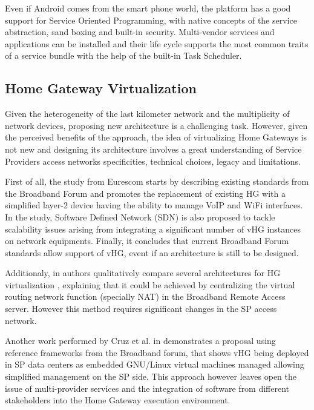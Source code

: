Even if Android comes from the smart phone world, the platform has a good support for Service Oriented Programming, with native concepts of the service abstraction, sand boxing and built-in security. Multi-vendor services and applications can be installed and their life cycle supports the most common traits of a service bundle with the help of the built-in Task Scheduler.

\subsection{Home Gateway Virtualization}
Given the heterogeneity of the last kilometer network and the multiplicity of network devices, proposing new architecture is a challenging task.
However, given the perceived benefits of the approach, the idea of virtualizing Home Gateways is not new and designing  its architecture involves a great understanding of Service Providers access networks specificities, technical choices, legacy and limitations.

First of all, the study from Eurescom \cite{daniel_abgrall_virtual_????} starts by describing existing standards from the Broadband Forum \cite{broadband_forum_functional_2014} and promotes the replacement of existing HG  with a simplified layer-2 device having the ability to manage VoIP and WiFi interfaces.
In the study, Software Defined Network (SDN) \cite{kim_improving_2013} is also proposed to tackle scalability issues arising from integrating a significant number of vHG instances on network equipments.
Finally,  it concludes that current Broadband Forum standards allow support of vHG, event if an architecture is still to be designed.

Additionaly, in \cite{da_silva_home_2011} authors qualitatively compare several architectures for HG virtualization , explaining that it could be achieved by centralizing the virtual routing network function (specially NAT) in the Broadband Remote Access server. However this method requires significant changes in the SP access network.

Another work performed by Cruz et al. in \cite{cruz_architecture_2013} demonstrates a proposal using reference frameworks from the Broadband forum, that shows vHG being deployed in SP data centers as embedded GNU/Linux virtual machines managed allowing simplified management on the SP side. This approach however leaves open the issue of multi-provider services and the integration of software from different stakeholders into the Home Gateway execution environment.

